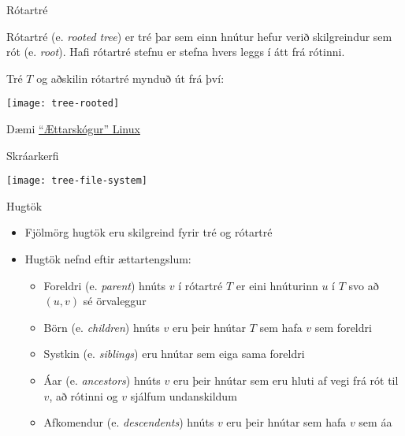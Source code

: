 \documentclass[handout]{beamer}
\begin{document}
\begin{frame}{Rótartré}
\begin{tcolorbox}[title=Rótartré]
Rótartré (e. \emph{rooted tree}) er tré þar sem einn hnútur hefur verið skilgreindur sem rót (e. \emph{root}). Hafi rótartré stefnu er stefna hvers leggs í átt frá rótinni.
\end{tcolorbox}
Tré $T$ og aðskilin rótartré mynduð út frá því:
\begin{center}
\texttt{[image: tree-rooted]}
\end{center}
\end{frame}

\begin{frame}{Dæmi}
\href{https://upload.wikimedia.org/wikipedia/commons/1/1b/Linux_Distribution_Timeline.svg}{``Ættarskógur'' Linux}
\end{frame}

\begin{frame}{Skráarkerfi}
\begin{center}
\texttt{[image: tree-file-system]}
\end{center}
\end{frame}

\begin{frame}{Hugtök}
\begin{itemize}
 \item Fjölmörg hugtök eru skilgreind fyrir tré og rótartré
 \item Hugtök nefnd eftir ættartengslum:
 \begin{itemize}
  \item Foreldri (e. \emph{parent}) hnúts $v$ í rótartré $T$ er eini hnúturinn $u$ í $T$ svo að $(u,v)$ sé örvaleggur
  \item Börn (e. \emph{children}) hnúts $v$ eru þeir hnútar $T$ sem hafa $v$ sem foreldri
  \item Systkin (e. \emph{siblings}) eru hnútar sem eiga sama foreldri
  \item Áar (e. \emph{ancestors}) hnúts $v$ eru þeir hnútar sem eru hluti af vegi frá rót til $v$, að rótinni og $v$ sjálfum undanskildum
  \item Afkomendur (e. \emph{descendents}) hnúts $v$ eru þeir hnútar sem hafa $v$ sem áa
 \end{itemize}
\end{itemize}
\end{frame}
\end{document}
